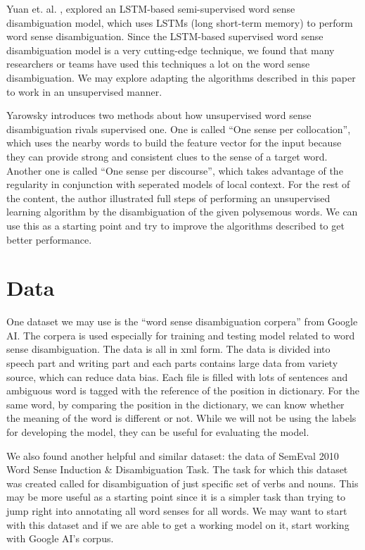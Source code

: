 \documentclass[11pt,letterpaper]{article}
\begin{document}
Yuan et. al. , explored an LSTM-based semi-supervised word sense disambiguation model, which uses LSTMs (long short-term memory) to perform word sense disambiguation. Since the LSTM-based supervised word sense disambiguation model is a very cutting-edge technique, we found that many researchers or teams have used this techniques a lot on the word sense disambiguation. We may explore adapting the algorithms described in this paper to work in an unsupervised manner.

Yarowsky  introduces two methods about how unsupervised word sense disambiguation rivals supervised one. One is called “One sense per collocation”, which uses the nearby words to build the feature vector for the input because they can provide strong and consistent clues to the sense of a target word. Another one is called “One sense per discourse”, which takes advantage of the regularity in conjunction with seperated models of local context. For the rest of the content, the author illustrated full steps of performing an unsupervised learning algorithm by the disambiguation of the given polysemous words. We can use this as a starting point and try to improve the algorithms described to get better performance.

\section{Data}
One dataset we may use is the ``word sense disambiguation corpera'' from Google AI. The corpera is used especially for training and testing model related to word sense disambiguation. The data is all in xml form. The data is divided into speech part and writing part and each parts contains large data from variety source, which can reduce data bias. Each file is filled with lots of sentences and ambiguous word is tagged with the reference of the position in dictionary. For the same word, by comparing the position in the dictionary, we can know whether the meaning of the word is different or not. While we will not be using the labels for developing the model, they can be useful for evaluating the model. 

We also found another helpful and similar dataset: the data of SemEval 2010 Word Sense Induction \& Disambiguation Task. The task for which this dataset was created called for disambiguation of just specific set of verbs and nouns. This may be more useful as a starting point since it is a simpler task than trying to jump right into annotating all word senses for all words. We may want to start with this dataset and if we are able to get a working model on it, start working with Google AI's corpus.
\end{document}
